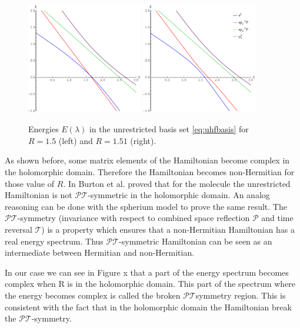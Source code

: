 \documentclass[11pt,a4paper]{article}
\newcommand{\pt}{$\mathcal{PT}$}
\begin{document}
\begin{figure}[h!]
    \centering
    \includegraphics[width=0.45\textwidth]{UHFCI.pdf}
    \includegraphics[width=0.45\textwidth]{UHFEP.pdf}
    \caption{\centering Energies $E(\lambda)$ in the unrestricted basis set \eqref{eq:uhfbasis} for $R=1.5$ (left) and $R=1.51$ (right).}
    \label{fig:UHFEP}
\end{figure}

As shown before, some matrix elements of the Hamiltonian become complex in the holomorphic domain. Therefore the Hamiltonian becomes non-Hermitian for those value of $R$. In \cite{Burton_2019a} Burton et al. proved that for the  molecule the unrestricted Hamiltonian is not \pt -symmetric in the holomorphic domain. An analog reasoning can be done with the spherium model to prove the same result. The \pt -symmetry (invariance with respect to combined space reflection $\mathcal{P}$ and time reversal $\mathcal{T}$) is a property which ensures that a non-Hermitian Hamiltonian has a real energy spectrum. Thus \pt -symmetric Hamiltonian can be seen as an intermediate between Hermitian and non-Hermitian.

 In our case we can see in Figure x that a part of the energy spectrum becomes complex when R is in the holomorphic domain. This part of the spectrum where the energy becomes complex is called the broken \pt symmetry  region. This is consistent with the fact that in the holomorphic domain the Hamiltonian break the \pt -symmetry. 
\end{document}
